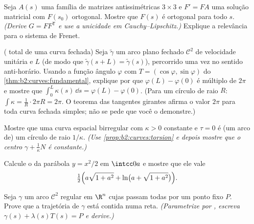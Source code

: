 \begin{exercise}[$\star\star\star$]\label{exo:b2:curves:7}
Seja $A(s)$ uma família  de matrizes antissimétricas $3 \times 3$
e $F' = F A$ uma solução matricial com $F(s_0)$
ortogonal. Mostre que $F(s)$ é ortogonal para todo $s$.
\emph{(Derive $G = F F^{\mathsf T}$ e use a unicidade em
Cauchy--Lipschitz.)} Explique a relevância para o sistema de Frenet.
\end{exercise}

\begin{exercise}[$\star\star\star$]\label{exo:b2:curves:8}
( total de uma curva  fechada) Seja $\tilde\gamma$ um
arco plano fechado $\mathcal{C}^2$ de velocidade unitária e  $L$
(de modo que $\tilde\gamma(s + L) = \tilde\gamma(s)$), percorrido uma vez
no sentido anti-horário. Usando a função ângulo $\varphi$ com $T =
(\cos\varphi, \sin\varphi)$ do
\cref{thm:b2:curves:fundamental}, explique por que $\varphi(L) -
\varphi(0)$ é múltiplo de $2\pi$ e mostre que
$\int_0^L \kappa(s)\,\dd s = \varphi(L) - \varphi(0)$. (Para um
círculo de raio $R$: $\int \kappa = \frac1R \cdot 2\pi R = 2\pi$.
O teorema das tangentes girantes afirma o valor $2\pi$ para
toda curva fechada simples; não se pede que você o demonstre.)
\end{exercise}

\begin{exercise}[$\star\star\star$]\label{exo:b2:curves:9}
Mostre que uma curva espacial birregular com $\kappa > 0$ constante e
$\tau = 0$ é (um arco de) um círculo de raio $1/\kappa$.
\emph{(Use \cref{prop:b2:curves:torsion} e depois mostre que o centro
$\gamma + \frac1\kappa N$ é constante.)}
\end{exercise}

\begin{exercise}[$\star$]\label{exo:b2:curves:10}
Calcule o  da parábola $y = x^2/2$ em
$\intcc0a$ e mostre que ele vale
\[
\tfrac12\Bigl(a\sqrt{1 + a^2} + \ln\bigl(a + \sqrt{1 +
a^2}\bigr)\Bigr).
\]
\end{exercise}

\begin{exercise}[$\star\star$]\label{exo:b2:curves:11}
Seja $\gamma$ um arco $\mathcal C^2$ regular em $\R^n$ cujas
 passam todas por um ponto fixo $P$. Prove que
a trajetória de $\gamma$ está contida numa reta.
\emph{(Parametrize por , escreva $\gamma(s) +
\lambda(s)T(s) = P$ e derive.)}
\end{exercise}

